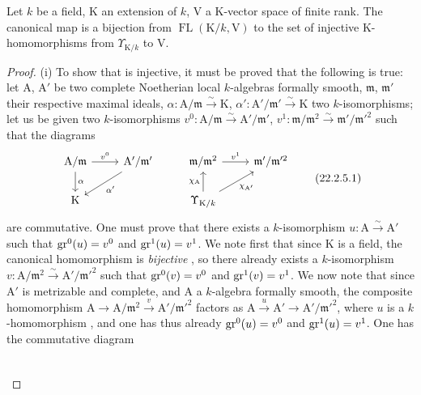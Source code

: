 \begin{proposition}[22.2.5]
\label{0.22.2.5}
Let $k$ be a field, $\mathrm{K}$ an extension of $k$, $\mathrm{V}$ a $\mathrm{K}$-vector space of finite rank.
The canonical map  is a bijection from $\operatorname{FL}(\mathrm{K}/k,\mathrm{V})$ to the set of injective $\mathrm{K}$-homomorphisms from $\Upsilon_{\mathrm{K}/k}$ to $\mathrm{V}$.
\end{proposition}

\begin{proof}
(i) To show that  is injective, it must be proved that the following is true: let $\mathrm{A}$, $\mathrm{A}'$ be two complete Noetherian local $k$-algebras formally smooth, $\mathfrak{m}$, $\mathfrak{m}'$ their respective maximal ideals, $\alpha:\mathrm{A}/\mathfrak{m}\xrightarrow{\sim}\mathrm{K}$, $\alpha':\mathrm{A}'/\mathfrak{m}'\xrightarrow{\sim}\mathrm{K}$ two $k$-isomorphisms; let us be given two $k$-isomorphisms $v^0:\mathrm{A}/\mathfrak{m}\xrightarrow{\sim}\mathrm{A}'/\mathfrak{m}'$, $v^1:\mathfrak{m}/\mathfrak{m}^2\xrightarrow{\sim}\mathfrak{m}'/\mathfrak{m}'^2$ such that the diagrams
\[
\label{0.22.2.5.1}
  \begin{tikzcd}
    \mathrm{A}/\mathfrak{m} \ar[r,"v^0"] \ar[d,"\alpha"] & \mathrm{A}'/\mathfrak{m}' \ar[dl,"\alpha'"] & \mathfrak{m}/\mathfrak{m}^2 \ar[r,"v^1"] & \mathfrak{m}'/\mathfrak{m}'^2\\
    \mathrm{K} & & \Upsilon_{\mathrm{K}/k} \ar[u,"\chi_\mathrm{A}"] \ar[ur,"\chi_{\mathrm{A}'}"'] &
  \end{tikzcd}
  \tag{22.2.5.1}
\]
are commutative.
One must prove that there exists a $k$-isomorphism $u:\mathrm{A}\xrightarrow{\sim}\mathrm{A}'$ such that $\operatorname{gr}^0(u)=v^0$ and $\operatorname{gr}^1(u)=v^1$.
We note first that since $\mathrm{K}$ is a field, the canonical homomorphism  is \emph{bijective} , so there already exists a $k$-isomorphism $v:\mathrm{A}/\mathfrak{m}^2\xrightarrow{\sim}\mathrm{A}'/\mathfrak{m}'^2$ such that $\operatorname{gr}^0(v)=v^0$ and $\operatorname{gr}^1(v)=v^1$.
We now note that since $\mathrm{A}'$ is metrizable and complete, and $\mathrm{A}$ a $k$-algebra formally smooth, the composite homomorphism $\mathrm{A}\to\mathrm{A}/\mathfrak{m}^2\xrightarrow{v}\mathrm{A}'/\mathfrak{m}'^2$ factors as $\mathrm{A}\xrightarrow{u}\mathrm{A}'\to\mathrm{A}'/\mathfrak{m}'^2$, where $u$ is a $k$-homomorphism , and one has thus already $\operatorname{gr}^0(u)=v^0$ and $\operatorname{gr}^1(u)=v^1$.
One has the commutative diagram
\[
  \begin{tikzcd}

\end{tikzcd}\]
\end{proof}
